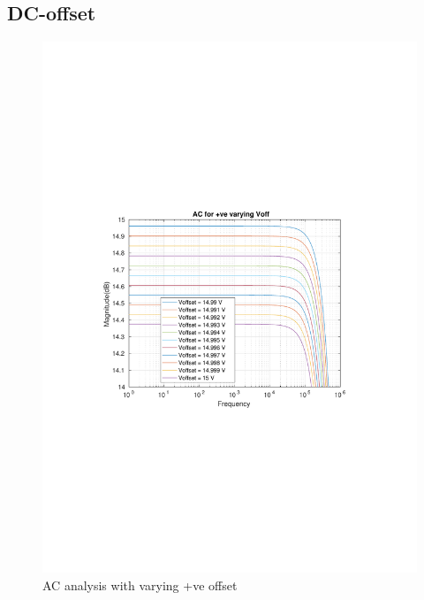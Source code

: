\documentclass[12pt,a4paper,UKenglish]{article}
\begin{document}
\subsection{DC-offset}
\begin{figure} [htbp]
  \centering 
  \includegraphics[width=\textwidth]{img/1c_pos_offset.pdf} 
  \caption{AC analysis with varying +ve offset}
  \label{ac_pos} 
\end{figure}
\end{document}
